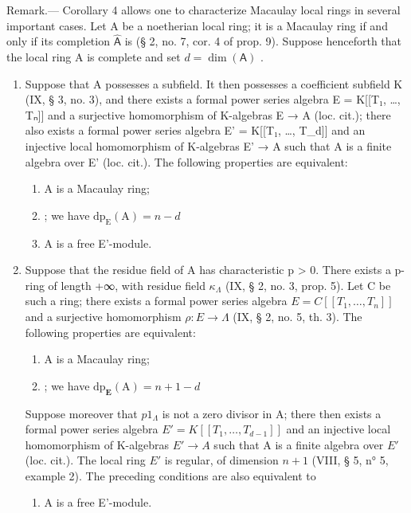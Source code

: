 Remark.--- Corollary 4 allows one to characterize Macaulay local rings in several important cases. Let A be a noetherian local ring; it is a Macaulay ring if and only if its completion \(\widehat{\mathsf{A}}\) is (§ 2, no. 7, cor. 4 of prop. 9). Suppose henceforth that the local ring A is complete and set \(d = \dim(\mathsf{A})\) .

\begin{enumerate}
\def\labelenumi{\alph{enumi})}
\tightlist
\item
  Suppose that A possesses a subfield. It then possesses a coefficient subfield K (IX, § 3, no. 3), and there exists a formal power series algebra E = K{[}{[}T₁, \ldots, Tₙ{]}{]} and a surjective homomorphism of K-algebras E → A (loc. cit.); there also exists a formal power series algebra E' = K{[}{[}T₁, \ldots, T\_d{]}{]} and an injective local homomorphism of K-algebras E' → A such that A is a finite algebra over E' (loc. cit.). The following properties are equivalent:
  \begin{enumerate}
  \def\labelenumii{(\roman{enumii})}
  \item
    A is a Macaulay ring;
  \item
    ; we have \(\mathrm{dp}_{\mathrm{E}}(\mathrm{A}) = n - d\)
  \item
    A is a free E'-module.
  \end{enumerate}

\item
  Suppose that the residue field of A has characteristic p \textgreater{} 0. There exists a p-ring of length +∞, with residue field \(\kappa_{\Lambda}\) (IX, § 2, no. 3, prop. 5). Let C be such a ring; there exists a formal power series algebra \(E = C[[T_{1}, \ldots, T_{n}]]\) and a surjective homomorphism \(\rho : E \to \Lambda\) (IX, § 2, no. 5, th. 3). The following properties are equivalent:
  \begin{enumerate}
  \def\labelenumii{(\roman{enumii})}
  \item
    A is a Macaulay ring;
  \item
    ; we have \(\mathrm{dp}_{\mathbf{E}}(\mathrm{A}) = n + 1 - d\)
  \end{enumerate}

Suppose moreover that \(p1_{\Lambda}\) is not a zero divisor in A; there then exists a formal power series algebra \(E' = K[[T_1, \ldots, T_{d-1}]]\) and an injective local homomorphism of K-algebras \(E' \to A\) such that A is a finite algebra over \(E'\) (loc. cit.). The local ring \(E'\) is regular, of dimension \(n+1\) (VIII, § 5, n° 5, example 2). The preceding conditions are also equivalent to

  \begin{enumerate}
  \def\labelenumii{(\roman{enumii})}
  \setcounter{enumii}{2}
  \tightlist
  \item
    A is a free E'-module.
  \end{enumerate}
\end{enumerate}

